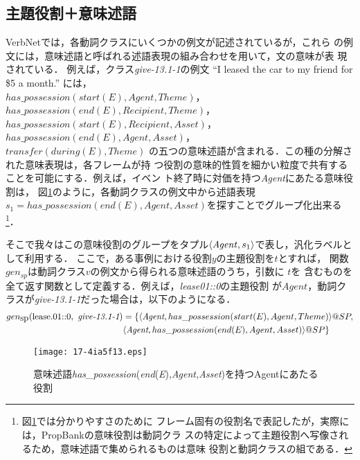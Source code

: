 \documentclass[japanese]{jnlp_1.4}
\begin{document}
\subsection{主題役割＋意味述語}

VerbNetでは，各動詞クラスにいくつかの例文が記述されているが，これら
の例文には，意味述語と呼ばれる述語表現の組み合わせを用いて，文の意味が表
現されている．
例えば，クラス{\it give-13.1-1}の例文
``I leased the car to my friend for \$5 a month.''
には，\\
$has\_possession(start(E), Agent, Theme)$，$has\_possession(end(E),
Recipient, Theme)$，\\
$has\_possession(start(E), Recipient, Asset)$，
$has\_possession(end(E), Agent, Asset)$，\\
$transfer(during(E), Theme)$
の五つの意味述語が含まれる．この種の分解された意味表現は，各フレームが持
つ役割の意味的性質を細かい粒度で共有することを可能にする．例えば，イベン
ト終了時に対価を持つ{\it Agent}にあたる意味役割は，
図\ref{fig:agent-of-possessing-asset}のように，各動詞クラスの例文中から述語表現
$s_1 = has\_possession(end(E), Agent, Asset)$を探すことでグループ化出来る
\footnote{図\ref{fig:agent-of-possessing-asset}では分かりやすさのために
フレーム固有の役割名で表記したが，実際には，PropBankの意味役割は動詞クラ
スの特定によって主題役割へ写像されるため，意味述語で集められるものは意味
役割と動詞クラスの組である．}．


そこで我々はこの意味役割のグループをタプル$\langle {\it
Agent},s_1\rangle$で表し，汎化ラベルとして利用する．
ここで，ある事例における役割$y$の主題役割を$t$とすれば，
関数$gen_{sp}$は動詞クラス$v$の例文から得られる意味述語のうち，引数に
$t$を
含むものを全て返す関数として定義する．例えば，{\it lease01::0}の主題役割
が$Agent$，動詞クラスが{\it give-13.1-1}だった場合は，以下のようになる．
\begin{align}
gen_{\mbox{sp}}(\mbox{lease.01::0},\mbox{ {\it give-13.1-1}}) &= \{
 \langle\mbox{{\it Agent}}, has\_possession(start(E), Agent,
 Theme)\rangle@SP,\nonumber \\
&\langle\mbox{{\it Agent}}, has\_possession(end(E), Agent, Asset)\rangle@SP \} 
\end{align}


\begin{figure}[t]
\begin{center}
\texttt{[image: 17-4ia5f13.eps]}
\end{center}
\caption{意味述語\textit{has\_possession}(\textit{end}(\textit{E}),\textit{Agent,Asset})を持つAgentにあたる役割}
\label{fig:agent-of-possessing-asset}
\end{figure}
\end{document}
